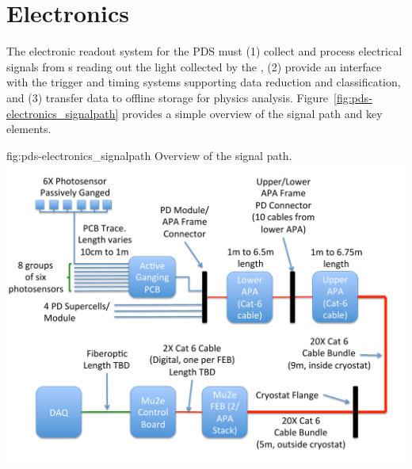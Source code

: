 
\section{Electronics}
\label{sec:fdsp-pd-pde}


The electronic readout system for the PDS must (1) collect and process electrical signals from s reading out the light collected by the , (2) provide an interface with the trigger and timing systems supporting data reduction and classification, and (3) transfer data to offline storage for physics analysis. Figure~\ref{fig:pds-electronics_signalpath} provides a simple overview of the signal path and key elements. 
\begin{dunefigure}
 {fig:pds-electronics_signalpath}
 {Overview of the  signal path.}
\includegraphics[width=15cm]{graphics/pds-signal-routing-diagram-r3.pdf}
\end{dunefigure}


